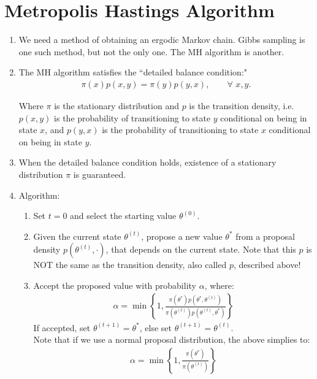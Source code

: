 \documentclass{article}
\begin{document}
\section{Metropolis Hastings Algorithm}
\begin{enumerate}
\item We need a method of obtaining an ergodic Markov chain.  Gibbs sampling is one such method, but not the only one.  The MH algorithm is another.  
\item The MH algorithm satisfies the ``detailed balance condition:" 
 \begin{align*}
    \pi(x)p(x,y) = \pi(y)p(y,x) , \qquad \forall\,\, x, y .
    \end{align*}

Where $\pi$ is the stationary distribution and $p$ is the transition density, i.e. $p(x,y)$ is the probability of transitioning to state $y$ conditional on being in state $x$, and $p(y,x)$ is the probability of transitioning to state $x$ conditional on being in state $y$.  
\item When the detailed balance condition holds, existence of a stationary distribution $\pi$ is guaranteed. 
\item Algorithm:
	\begin{enumerate}
    \item Set $t=0 $ and select the starting value $\theta^{(0)}$.
    \item\label{prop_step} Given the current state $\theta^{(t)}$, propose a new value $\theta^{*}$ from a proposal density $p(\theta^{(t)},\cdot)$, that depends on the current state. Note that this $p$ is NOT the same as the transition density, also called $p$, described above! 
    \item Accept the proposed value with probability $\alpha$, where:
    \begin{align*}
    \alpha = \min \left\{ 1 , \frac{\pi(\theta^{*})p(\theta^{*},\theta^{(t)})}{\pi(\theta^{(t)})p(\theta^{(t)},\theta^{*})} \right\} 
    \end{align*}
    If accepted, set $\theta^{(t+1)}=\theta^{*}$, else set $\theta^{(t+1)}=\theta^{(t)}$. \\
    
   Note that if we use a normal proposal distribution, the above simplies to:
    \begin{align*}
       \alpha = \min \left\{ 1 , \frac{\pi(\theta^{*})}{\pi(\theta^{(t)})} \right\} 
              \end{align*}
   

\end{enumerate}
\end{enumerate}
\end{document}
